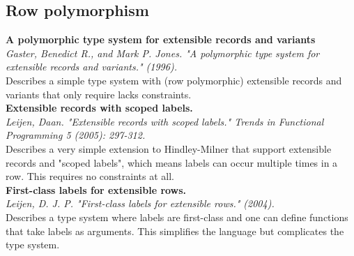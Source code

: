 \documentclass[12pt]{article}
\begin{document}
\subsection{Row polymorphism}
\textbf{A polymorphic type system for extensible records and variants} \\
\textit{Gaster, Benedict R., and Mark P. Jones. "A polymorphic type system for extensible records and variants." (1996).} \\
Describes a simple type system with (row polymorphic) extensible records and variants that only require lacks constraints.
\\
\textbf{Extensible records with scoped labels.} \\
\textit{Leijen, Daan. "Extensible records with scoped labels." Trends in Functional Programming 5 (2005): 297-312.} \\
Describes a very simple extension to Hindley-Milner that support extensible records and "scoped labels", which means labels can occur multiple times in a row.
This requires no constraints at all.
\\
\textbf{First-class labels for extensible rows.} \\
\textit{Leijen, D. J. P. "First-class labels for extensible rows." (2004).} \\
Describes a type system where labels are first-class and one can define functions that take labels as arguments.
This simplifies the language but complicates the type system.
\end{document}
